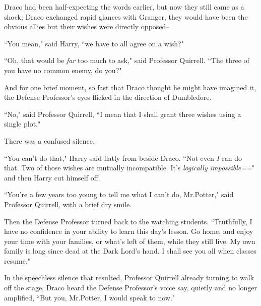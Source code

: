 Draco had been half-expecting the words earlier, but now they still came as a shock; Draco exchanged rapid glances with Granger, they would have been the obvious allies but their wishes were directly opposed\---

``You mean," said Harry, ``we have to all agree on a wish?"

``Oh, that would be \emph{far} too much to ask," said Professor Quirrell. ``The three of you have no common enemy, do you?"

And for one brief moment, so fast that Draco thought he might have imagined it, the Defense Professor's eyes flicked in the direction of Dumbledore.

``No," said Professor Quirrell, ``I mean that I shall grant three wishes using a single plot."

There was a confused silence.

``You can't do that," Harry said flatly from beside Draco. ``Not even \emph{I} can do that. Two of those wishes are mutually incompatible. It's \emph{logically impossible\===}" and then Harry cut himself off.

``You're a few years too young to tell me what I can't do, Mr.\?Potter," said Professor Quirrell, with a brief dry smile.

Then the Defense Professor turned back to the watching students. ``Truthfully, I have no confidence in your ability to learn this day's lesson. Go home, and enjoy your time with your families, or what's left of them, while they still live. My own family is long since dead at the Dark Lord's hand. I shall see you all when classes resume."

In the speechless silence that resulted, Professor Quirrell already turning to walk off the stage, Draco heard the Defense Professor's voice say, quietly and no longer amplified, ``But you, Mr.\?Potter, I would speak to now."

